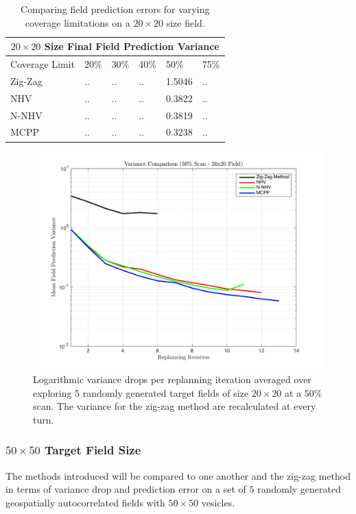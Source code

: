 \begin{table}[ht!]
\centering
	\begin{tabular}{ |p{3cm}||p{1cm}|p{1cm}|p{1cm}|p{1cm}|p{1cm}|  }
		\hline
		\multicolumn{6}{|c|}{$20 \times 20$ Size Final Field Prediction Variance} \\
		\hline
		Coverage Limit & 20\% & 30\% & 40\% & 50\% & 75\% \\
		\hline
		Zig-Zag        & .. & .. & .. & 1.5046 & .. \\
		NHV            & .. & .. & .. & 0.3822 & .. \\
		N-NHV          & .. & .. & .. & 0.3819 & .. \\
		MCPP           & .. & .. & .. & 0.3238 & .. \\
		\hline
	\end{tabular}
	\caption{Comparing field prediction errors for varying coverage limitations on a $20 \times 20$ size field.}
    \label{tab:20fieldvar}
\end{table}

\begin{figure}[hb!]
	\centering
	\includegraphics[width=0.8\linewidth]{figures/vars_semilogy_20x20_50percent_5runs.png}
    \captionsetup{skip=0.20\baselineskip,size=footnotesize}
	\caption{Logarithmic variance drops per replanning iteration averaged over exploring 5 randomly generated target fields of size $20 \times 20$ at a $50\%$ scan. The variance for the zig-zag method are recalculated at every turn.}
\end{figure}

\subsubsection{$50 \times 50$ Target Field Size}
The methods introduced will be compared to one another and the zig-zag method in terms of variance drop and prediction error on a set of $5$ randomly generated geospatially autocorrelated fields with $50\times 50$ vesicles.

